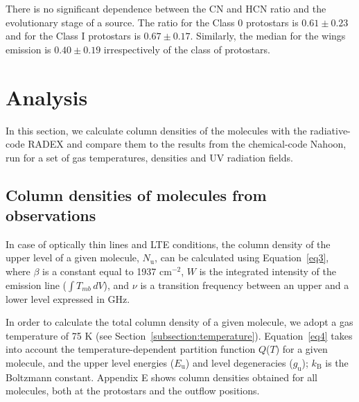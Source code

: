 \documentclass{aa}
\begin{document}
There is no significant dependence between the CN and HCN ratio and the evolutionary stage of a source. The ratio for the
Class 0 protostars is $0.61 \pm 0.23$ and for the Class I protostars is $0.67 \pm 0.17$. Similarly, the median for the wings emission is $0.40 \pm 0.19$ irrespectively of the class of protostars.

\section{Analysis}
\label{section:analysis}

In this section, we calculate column densities of the molecules with the radiative-code RADEX and compare them to the results from the chemical-code Nahoon, 
run for a set of gas temperatures, densities and UV radiation fields. 
\subsection{Column densities of molecules from observations}
\label{subsection:column_densities}


In case of optically thin lines and LTE conditions, the column density of the 
upper level of a given molecule, $N_\mathrm{u}$, can be calculated using Equation~\ref{eq3}, where $\beta$ is a constant equal to 1937 cm$^{-2}$, $W$ is the integrated
intensity of the emission line ($\int{T_{mb} \, dV}$), and $\nu$ is a transition 
frequency between an upper and a lower level expressed in GHz. 

In order to calculate the total column density of a given molecule, 
we adopt a gas temperature of 75 K (see Section~\ref{subsection:temperature}). Equation~\ref{eq4} takes into account the 
temperature-dependent partition function $Q$($T$) for a given molecule, and 
the upper level energies ($E_\mathrm{u}$) and level degeneracies ($g_\mathrm{u}$);
$k_\mathrm{B}$ is the Boltzmann constant. Appendix E shows column densities obtained for all molecules, both at the protostars and the outflow positions.
\end{document}
